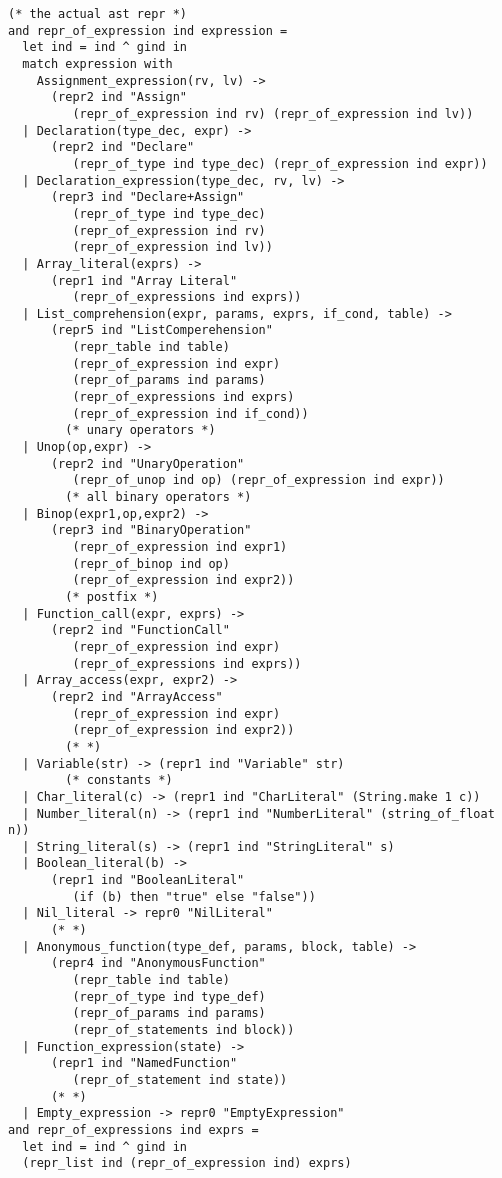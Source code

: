 \begin{verbatim}
(* the actual ast repr *)
and repr_of_expression ind expression =
  let ind = ind ^ gind in
  match expression with
    Assignment_expression(rv, lv) ->
      (repr2 ind "Assign"
         (repr_of_expression ind rv) (repr_of_expression ind lv))
  | Declaration(type_dec, expr) ->
      (repr2 ind "Declare"
         (repr_of_type ind type_dec) (repr_of_expression ind expr))
  | Declaration_expression(type_dec, rv, lv) ->
      (repr3 ind "Declare+Assign"
         (repr_of_type ind type_dec)
         (repr_of_expression ind rv)
         (repr_of_expression ind lv))
  | Array_literal(exprs) ->
      (repr1 ind "Array Literal"
         (repr_of_expressions ind exprs))
  | List_comprehension(expr, params, exprs, if_cond, table) ->
      (repr5 ind "ListComperehension"
         (repr_table ind table)
         (repr_of_expression ind expr)
         (repr_of_params ind params)
         (repr_of_expressions ind exprs)
         (repr_of_expression ind if_cond))
        (* unary operators *)
  | Unop(op,expr) ->
      (repr2 ind "UnaryOperation"
         (repr_of_unop ind op) (repr_of_expression ind expr))
        (* all binary operators *)
  | Binop(expr1,op,expr2) ->
      (repr3 ind "BinaryOperation"
         (repr_of_expression ind expr1)
         (repr_of_binop ind op)
         (repr_of_expression ind expr2))
        (* postfix *)
  | Function_call(expr, exprs) ->
      (repr2 ind "FunctionCall"
         (repr_of_expression ind expr)
         (repr_of_expressions ind exprs))
  | Array_access(expr, expr2) ->
      (repr2 ind "ArrayAccess"
         (repr_of_expression ind expr)
         (repr_of_expression ind expr2))
        (* *)
  | Variable(str) -> (repr1 ind "Variable" str)
        (* constants *)
  | Char_literal(c) -> (repr1 ind "CharLiteral" (String.make 1 c))
  | Number_literal(n) -> (repr1 ind "NumberLiteral" (string_of_float n))
  | String_literal(s) -> (repr1 ind "StringLiteral" s)
  | Boolean_literal(b) ->
      (repr1 ind "BooleanLiteral"
         (if (b) then "true" else "false"))
  | Nil_literal -> repr0 "NilLiteral"
      (* *)
  | Anonymous_function(type_def, params, block, table) ->
      (repr4 ind "AnonymousFunction"
         (repr_table ind table)
         (repr_of_type ind type_def)
         (repr_of_params ind params)
         (repr_of_statements ind block))
  | Function_expression(state) ->
      (repr1 ind "NamedFunction"
         (repr_of_statement ind state))
      (* *)
  | Empty_expression -> repr0 "EmptyExpression"
and repr_of_expressions ind exprs =
  let ind = ind ^ gind in
  (repr_list ind (repr_of_expression ind) exprs)


\end{verbatim}
